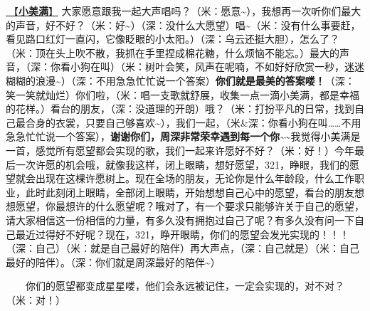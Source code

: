 \documentclass[]{ctexbook}
\begin{document}
\hyperref[happy-ending]{🎵【\textbf{小美满}】} 大家愿意跟我一起大声唱吗？（米：愿意\textasciitilde），我想再一次听你们最大的声音，好不好？（米：好\textasciitilde）（深：没什么大愿望）唱\textasciitilde（米：没有什么事要赶，看见路口红灯一直闪，它像眨眼的小太阳。）（深：乌云还挺大胆），怎么了？（米：顶在头上吹不散，我抓在手里捏成棉花糖，什么烦恼不能忘。）最大的声音，（深：你看小狗在叫）（米：树叶会笑，风声在呢喃，不如好好欣赏一秒，迷迷糊糊的浪漫\textasciitilde）（深：不用急急忙忙说一个答案）\textbf{你们就是最美的答案喽！}（深：笑一笑就灿烂）你们啦，（米：唱一支歌就舒展，收集一点一滴小美满，都是幸福的花样。）看台的朋友，（深：没道理的开朗）哦？（米：打扮平凡的日常，找到自己最合身的衣裳，只要自己够喜欢\textasciitilde），我们一起，（米\&深：你看小狗在叫\ldots\ldots 不用急急忙忙说一个答案），\textbf{谢谢你们，周深非常荣幸遇到每一个你}\textasciitilde\textasciitilde 我觉得小美满是一首，感觉所有愿望都会实现的歌，我们一起来许愿好不好？（米：好！）今年最后一次许愿的机会哦，就像我这样，闭上眼睛，想好愿望，321，睁眼，我们的愿望就会出现在这棵许愿树上。现在全场的朋友，无论你是什么年龄段，什么工作职业，此时此刻闭上眼睛，全部闭上眼睛，开始想想自己心中的愿望，看台的朋友想想愿望，你最想许的什么愿望呢？哦对了，有一个要求只能够许关于自己的愿望，请大家相信这一份相信的力量，有多久没有拥抱过自己了呢？有多久没有问一下自己最近过得好不好呢？现在，321，睁开眼睛，你们的愿望会发光实现的！！！（深：自己）（米：就是自己最好的陪伴）再大声点，（深：自己就是）（米：自己最好的陪伴）。（深：你们就是周深最好的陪伴\textasciitilde）

  你们的愿望都变成星星喽，他们会永远被记住，一定会实现的，对不对？（米：对！）
\end{document}
